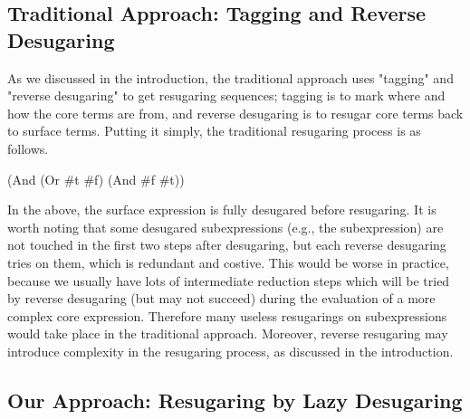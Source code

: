 \subsection{Traditional Approach: Tagging and Reverse Desugaring}

As we discussed in the introduction, the traditional approach uses "tagging" and "reverse desugaring" to get resugaring sequences; tagging is to mark where and how the core terms are from, and reverse desugaring is to resugar core terms back to surface terms. Putting it simply, the traditional resugaring process is as follows.

\begin{Codes}
    (And (Or \#t \#f) (And \#f \#t))
\end{Codes}

In the above, the surface expression is fully desugared before resugaring. It is worth noting that some desugared subexpressions (e.g., the  subexpression) are not touched in the first two steps after desugaring, but each reverse desugaring tries on them, which is redundant and costive. This would be worse in practice, because we usually have lots of intermediate reduction steps which will be tried by reverse desugaring (but  may not succeed) during the evaluation of a more complex core expression. Therefore many useless resugarings on subexpressions would take place in the traditional approach. Moreover, reverse resugaring may introduce complexity in the resugaring process, as discussed in the introduction.

\subsection{Our Approach: Resugaring by Lazy Desugaring}

